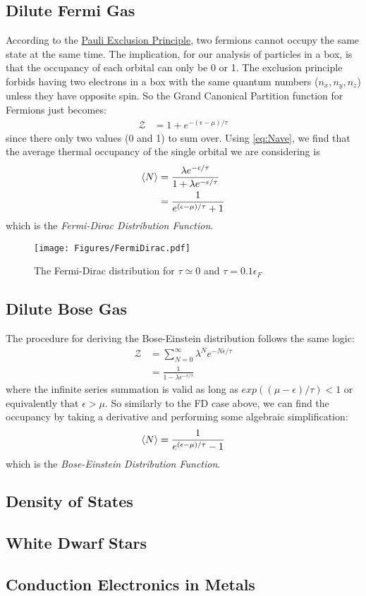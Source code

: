 \subsection{Dilute Fermi Gas}
According to the \href{http://en.wikipedia.org/wiki/Pauli_exclusion_principle}{Pauli Exclusion Principle}, two fermions cannot occupy the same state at the same time. The implication, for our analysis of particles in a box, is that the occupancy of each orbital can only be 0 or 1. The exclusion principle forbids having two electrons in a box with the same quantum numbers ($n_x, n_y, n_z$) unless they have opposite spin. So the Grand Canonical Partition function for Fermions just becomes:
\begin{align}
\mathscr{Z} &= 1 + e^{-(\epsilon - \mu)/\tau}
\end{align}
since there only two values (0 and 1) to sum over. Using \cref{eq:Nave}, we find that the average thermal occupancy of the single orbital we are considering is
\begin{align}
\Braket{N} &= \frac{\lambda e^{-\epsilon/\tau}}{1 + \lambda e^{-\epsilon/\tau}}\\
           &= \frac{1}{e^{(\epsilon - \mu)/\tau} + 1}
\end{align}
which is the \emph{Fermi-Dirac Distribution Function}.
\begin{figure}[h]
\centering
\texttt{[image: Figures/FermiDirac.pdf]}
\caption{The Fermi-Dirac distribution for $\tau \simeq 0$ and $\tau = 0.1\epsilon_F$}
\end{figure}

\subsection{Dilute Bose Gas}
The procedure for deriving the Bose-Einstein distribution follows the same logic:
\begin{align}
\mathscr{Z} &= \sum_{N=0}^{\infty} \lambda^N e^{-N \epsilon/\tau}\\
            &= \frac{1}{1 - \lambda e^{-\epsilon/\tau}}
\end{align}
where the infinite series summation is valid as long as 
$exp((\mu-\epsilon)/\tau) < 1$ or equivalently that $\epsilon > \mu$.
So similarly to the FD case above, we can find the occupancy by taking a derivative and performing
some algebraic simplification:
\begin{equation}
\Braket{N} = \frac{1}{e^{(\epsilon - \mu)/\tau} - 1}
\end{equation}
which is the \emph{Bose-Einstein Distribution Function}.

\subsection{Density of States}

\subsection{White Dwarf Stars}

\subsection{Conduction Electronics in Metals}



